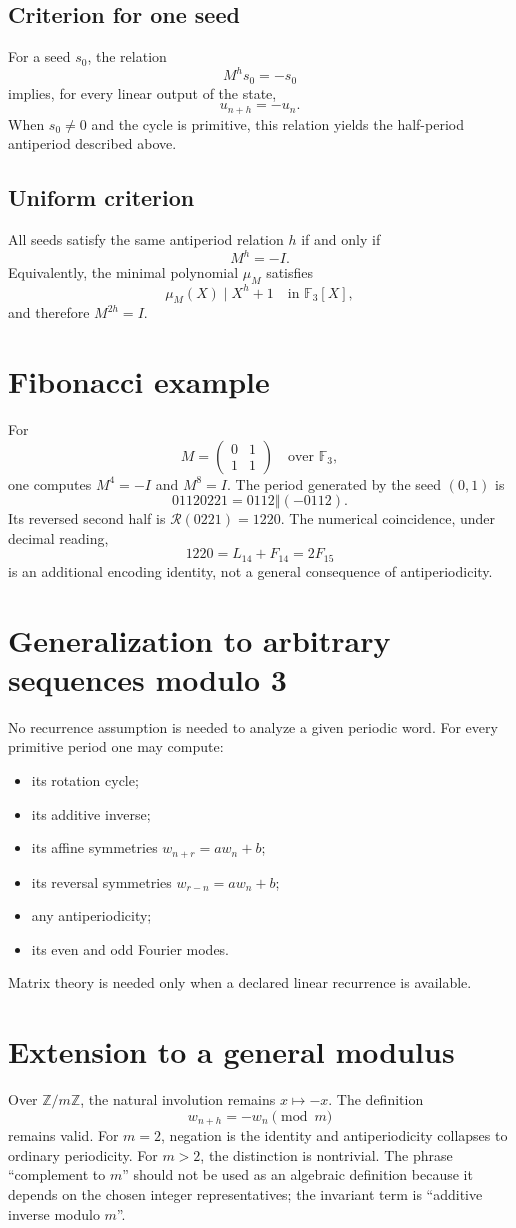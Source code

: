 \documentclass[11pt,a4paper]{article}
\newcommand{\F}{\mathbb F}\newcommand{\Z}{\mathbb Z}\newcommand{\concat}{\mathbin{\Vert}}
\begin{document}
\subsection{Criterion for one seed}
For a seed \(s_0\), the relation \[M^hs_0=-s_0\] implies, for every linear output of the state, \[u_{n+h}=-u_n.\] When \(s_0\neq0\) and the cycle is primitive, this relation yields the half-period antiperiod described above.
\subsection{Uniform criterion}
All seeds satisfy the same antiperiod relation \(h\) if and only if \[M^h=-I.\] Equivalently, the minimal polynomial \(\mu_M\) satisfies \[\mu_M(X)\mid X^h+1\quad\text{in }\F_3[X],\] and therefore \(M^{2h}=I\).
\section{Fibonacci example}
For \[M=\begin{pmatrix}0&1\\1&1\end{pmatrix}\quad\text{over }\F_3,\] one computes \(M^4=-I\) and \(M^8=I\). The period generated by the seed \((0,1)\) is \[01120221=0112\concat(-0112).\] Its reversed second half is \(\mathcal R(0221)=1220\). The numerical coincidence, under decimal reading, \[1220=L_{14}+F_{14}=2F_{15}\] is an additional encoding identity, not a general consequence of antiperiodicity.
\section{Generalization to arbitrary sequences modulo 3}
No recurrence assumption is needed to analyze a given periodic word. For every primitive period one may compute: \begin{itemize}\item its rotation cycle;\item its additive inverse;\item its affine symmetries \(w_{n+r}=aw_n+b\);\item its reversal symmetries \(w_{r-n}=aw_n+b\);\item any antiperiodicity;\item its even and odd Fourier modes.\end{itemize} Matrix theory is needed only when a declared linear recurrence is available.
\section{Extension to a general modulus}
Over \(\Z/m\Z\), the natural involution remains \(x\mapsto-x\). The definition \[w_{n+h}=-w_n\pmod m\] remains valid. For \(m=2\), negation is the identity and antiperiodicity collapses to ordinary periodicity. For \(m>2\), the distinction is nontrivial. The phrase ``complement to \(m\)'' should not be used as an algebraic definition because it depends on the chosen integer representatives; the invariant term is ``additive inverse modulo \(m\)''.
\end{document}
